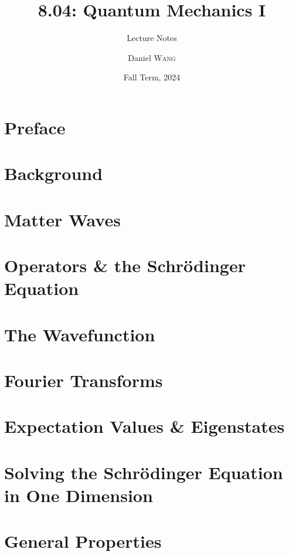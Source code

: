 \documentclass[12pt]{report}
\institute{Lakeside School}
\title{8.04: Quantum Mechanics I}
\subtitle{Lecture Notes}
\author{Daniel \textsc{Wang}}
\date{Fall Term, 2024}
\begin{document}
    \maketitle
    \romantableofcontents

    \chapter*{Preface}
    
    
    \chapter{Background}
    

    \chapter{Matter Waves}
    

    \chapter{Operators \& the Schrödinger Equation}    

    \chapter{The Wavefunction}
    

    \chapter{Fourier Transforms}
    

    \chapter{Expectation Values \& Eigenstates}
    

    \chapter{Solving the Schrödinger Equation in One Dimension}
    

    \chapter{General Properties}
    
\end{document}

